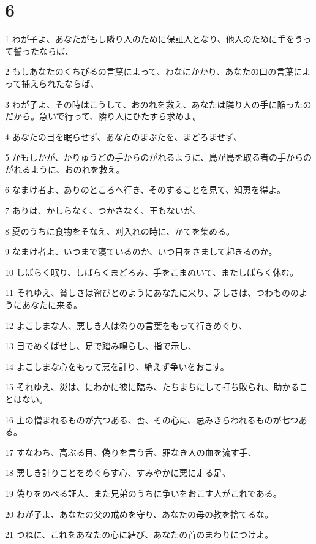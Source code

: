 \chapter{6}

\par 1 わが子よ、あなたがもし隣り人のために保証人となり、他人のために手をうって誓ったならば、
\par 2 もしあなたのくちびるの言葉によって、わなにかかり、あなたの口の言葉によって捕えられたならば、
\par 3 わが子よ、その時はこうして、おのれを救え、あなたは隣り人の手に陥ったのだから。急いで行って、隣り人にひたすら求めよ。
\par 4 あなたの目を眠らせず、あなたのまぶたを、まどろませず、
\par 5 かもしかが、かりゅうどの手からのがれるように、鳥が鳥を取る者の手からのがれるように、おのれを救え。
\par 6 なまけ者よ、ありのところへ行き、そのすることを見て、知恵を得よ。
\par 7 ありは、かしらなく、つかさなく、王もないが、
\par 8 夏のうちに食物をそなえ、刈入れの時に、かてを集める。
\par 9 なまけ者よ、いつまで寝ているのか、いつ目をさまして起きるのか。
\par 10 しばらく眠り、しばらくまどろみ、手をこまぬいて、またしばらく休む。
\par 11 それゆえ、貧しさは盗びとのようにあなたに来り、乏しさは、つわもののようにあなたに来る。
\par 12 よこしまな人、悪しき人は偽りの言葉をもって行きめぐり、
\par 13 目でめくばせし、足で踏み鳴らし、指で示し、
\par 14 よこしまな心をもって悪を計り、絶えず争いをおこす。
\par 15 それゆえ、災は、にわかに彼に臨み、たちまちにして打ち敗られ、助かることはない。
\par 16 主の憎まれるものが六つある、否、その心に、忌みきらわれるものが七つある。
\par 17 すなわち、高ぶる目、偽りを言う舌、罪なき人の血を流す手、
\par 18 悪しき計りごとをめぐらす心、すみやかに悪に走る足、
\par 19 偽りをのべる証人、また兄弟のうちに争いをおこす人がこれである。
\par 20 わが子よ、あなたの父の戒めを守り、あなたの母の教を捨てるな。
\par 21 つねに、これをあなたの心に結び、あなたの首のまわりにつけよ。
